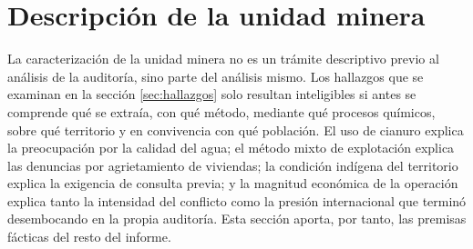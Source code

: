%
%

\section{Descripción de la unidad minera}
\label{sec:unidad}

La caracterización de la unidad minera no es un trámite descriptivo previo al
análisis de la auditoría, sino parte del análisis mismo. Los hallazgos que se
examinan en la sección \ref{sec:hallazgos} solo resultan inteligibles si antes se
comprende qué se extraía, con qué método, mediante qué procesos químicos, sobre
qué territorio y en convivencia con qué población. El uso de cianuro explica la
preocupación por la calidad del agua; el método mixto de explotación explica las
denuncias por agrietamiento de viviendas; la condición indígena del territorio
explica la exigencia de consulta previa; y la magnitud económica de la operación
explica tanto la intensidad del conflicto como la presión internacional que
terminó desembocando en la propia auditoría. Esta sección aporta, por tanto, las
premisas fácticas del resto del informe.

